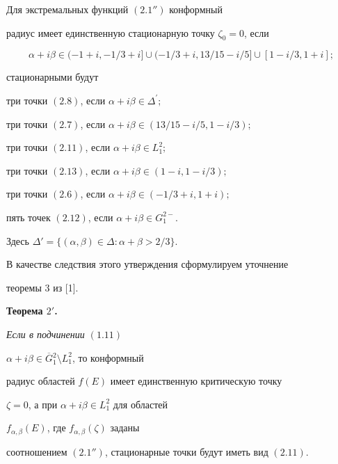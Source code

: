 \begin{thm}


Для экстремальных функций $(2.1'')$ конформный


радиус имеет единственную стационарную точку $\zeta_0=0$, если


$$


\alpha+i\beta\in(-1+i,-1/3+i]\cup(-1/3+i,13/15-i/5]\cup[1-i/3,


1+i];


$$





стационарными будут





три точки $(2.8)$, если $\alpha+i\beta\in\Delta^\prime;$





три точки $(2.7)$, если $ \alpha+i\beta\in(13/15-i/5,1-i/3);$





три точки $(2.11)$, если $\alpha+i\beta\in L_1^2;$





три точки $(2.13)$, если $\alpha+i\beta\in(1-i,1-i/3);$





три точки $(2.6)$, если $\alpha+i\beta\in(-1/3+i,1+i);$





пять точек $(2.12)$, если $\alpha+i\beta\in G_1^{2-}$.





\noindent{}Здесь $\Delta'=\{(\alpha,\beta)\in\Delta: \alpha+\beta>2/3\}$.


\end{thm}





В качестве следствия этого утверждения сформулируем уточнение


теоремы 3 из [1].


\medskip





{\bf Теорема $2'$.} {\it Если в подчинении $(1.11)$


$\alpha+i\beta\in \overline G{}_1^2\setminus L_1^2$, то конформный


радиус областей $f(E)$ имеет единственную критическую точку


$\zeta=0$, а при $\alpha+i\beta\in L_1^2$ для областей


$f_{\alpha,\beta}(E)$, где $f_{\alpha,\beta}(\zeta)$ заданы


соотношением $(2.1'')$, стационарные точки будут иметь вид $(2.11)$.}


